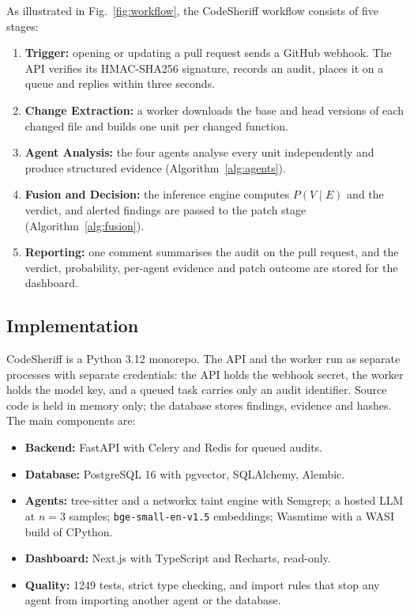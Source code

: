 \documentclass[conference]{IEEEtran}
\begin{document}
As illustrated in Fig.~\ref{fig:workflow}, the CodeSheriff workflow
consists of five stages:
\begin{enumerate}
\item \textbf{Trigger:} opening or updating a pull request sends a GitHub
webhook. The API verifies its HMAC-SHA256 signature, records an audit,
places it on a queue and replies within three seconds.
\item \textbf{Change Extraction:} a worker downloads the base and head
versions of each changed file and builds one unit per changed function.
\item \textbf{Agent Analysis:} the four agents analyse every unit
independently and produce structured evidence
(Algorithm~\ref{alg:agents}).
\item \textbf{Fusion and Decision:} the inference engine computes
$P(V\mid E)$ and the verdict, and alerted findings are passed to the patch
stage (Algorithm~\ref{alg:fusion}).
\item \textbf{Reporting:} one comment summarises the audit on the pull
request, and the verdict, probability, per-agent evidence and patch outcome
are stored for the dashboard.
\end{enumerate}

\subsection{Implementation}

CodeSheriff is a Python 3.12 monorepo. The API and the worker run as
separate processes with separate credentials: the API holds the webhook
secret, the worker holds the model key, and a queued task carries only an
audit identifier. Source code is held in memory only; the database stores
findings, evidence and hashes. The main components are:
\begin{itemize}
\item \textbf{Backend:} FastAPI with Celery and Redis for queued audits.
\item \textbf{Database:} PostgreSQL 16 with pgvector, SQLAlchemy, Alembic.
\item \textbf{Agents:} tree-sitter and a networkx taint engine with
Semgrep; a hosted LLM at $n=3$ samples; \texttt{bge-small-en-v1.5}
embeddings; Wasmtime with a WASI build of CPython.
\item \textbf{Dashboard:} Next.js with TypeScript and Recharts, read-only.
\item \textbf{Quality:} 1249 tests, strict type checking, and import rules
that stop any agent from importing another agent or the database.
\end{itemize}
\end{document}
